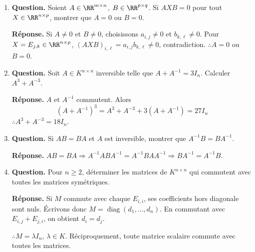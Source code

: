 \documentclass[12pt, a4paper]{article}
\begin{document}
\begin{enumerate}[label=4.\arabic*., start=60]
  \item \begin{minipage}[t]{\linewidth}\raggedright
\textbf{Question.} Soient $A\in\RR^{m\times n}$, $B\in\RR^{p\times q}$. Si $AXB=0$ pour tout $X\in\RR^{n\times p}$, montrer que $A=0$ ou $B=0$.
\par\smallskip
\textbf{Réponse.} Si $A\neq0$ et $B\neq0$, choisissons $a_{i,j}\neq0$ et $b_{k,\ell}\neq0$.
    Pour $X=E_{j,k}\in\RR^{n\times p}$, $(AXB)_{i,\ell}=a_{i,j}b_{k,\ell}\neq0$, contradiction.
    $\therefore A=0$ ou $B=0$.
\end{minipage}

  \item \begin{minipage}[t]{\linewidth}\raggedright
\textbf{Question.} Soit $A\in K^{n\times n}$ inversible telle que $A+A^{-1}=3I_n$. Calculer $A^3+A^{-3}$.
\par\smallskip
\textbf{Réponse.} $A$ et $A^{-1}$ commutent. Alors
    \[
      (A+A^{-1})^3=A^3+A^{-3}+3(A+A^{-1})=27I_n
    \]
    $\therefore A^3+A^{-3}=18I_n$.
\end{minipage}

  \item \begin{minipage}[t]{\linewidth}\raggedright
\textbf{Question.} Si $AB=BA$ et $A$ est inversible, montrer que $A^{-1}B=BA^{-1}$.
\par\smallskip
\textbf{Réponse.} $AB=BA\Rightarrow A^{-1}ABA^{-1}=A^{-1}BAA^{-1}\Rightarrow BA^{-1}=A^{-1}B$.
\end{minipage}

  \item \begin{minipage}[t]{\linewidth}\raggedright
\textbf{Question.} Pour $n\geq2$, déterminer les matrices de $K^{n\times n}$ qui commutent avec toutes les matrices symétriques.
\par\smallskip
\textbf{Réponse.} Si $M$ commute avec chaque $E_{i,i}$, ses coefficients hors diagonale sont nuls.
    Écrivons donc $M=\operatorname{diag}(d_1,\ldots,d_n)$.
    En commutant avec $E_{i,j}+E_{j,i}$, on obtient $d_i=d_j$.

    $\therefore M=\lambda I_n$, $\lambda\in K$.
    Réciproquement, toute matrice scalaire commute avec toutes les matrices.
\end{minipage}


\end{enumerate}
\end{document}
